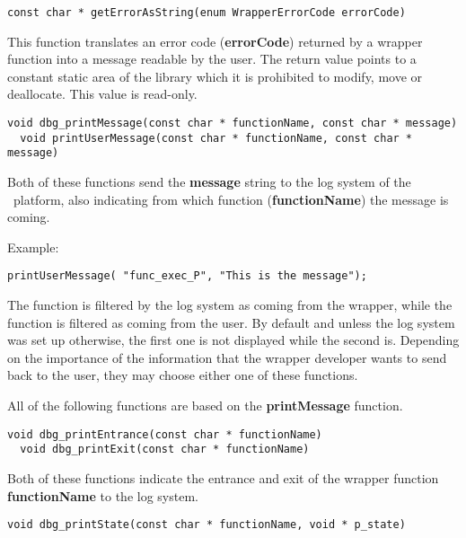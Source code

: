 \lstset{language=C++, basicstyle=\normalsize}
\begin{lstlisting}[frame=TRBL]
  const char * getErrorAsString(enum WrapperErrorCode errorCode)
\end{lstlisting}

This function translates an error code ({\bf errorCode}) returned by a wrapper function into a message readable by the user. The return value points to a constant static area of the library which it is prohibited to modify, move or deallocate. This value is read-only.

\lstset{language=C++, basicstyle=\normalsize}
\begin{lstlisting}[frame=TRBL]
  void dbg_printMessage(const char * functionName, const char * message)
  void printUserMessage(const char * functionName, const char * message)
\end{lstlisting}

Both of these functions send the {\bf message} string to the log system of the \OT\ platform, also indicating from which function ({\bf functionName}) the message is coming.

Example:
\lstset{language=C++, basicstyle=\normalsize}
\begin{lstlisting}[frame=TRBL]
  printUserMessage( "func_exec_P", "This is the message");
\end{lstlisting}

The  function is filtered by the log system as coming from the wrapper, while the  function is filtered as coming from the user. By default and unless the log system was set up otherwise, the first one is not displayed while the second is. Depending on the importance of the information that the wrapper developer wants to send back to the user, they may choose either one of these functions.

All of the following functions are based on the {\bf printMessage} function.

\lstset{language=C++, basicstyle=\normalsize}
\begin{lstlisting}[frame=TRBL]
  void dbg_printEntrance(const char * functionName)
  void dbg_printExit(const char * functionName)
\end{lstlisting}

Both of these functions indicate the entrance and exit of the wrapper function {\bf functionName} to the log system.

\lstset{language=C++, basicstyle=\normalsize}
\begin{lstlisting}[frame=TRBL]
  void dbg_printState(const char * functionName, void * p_state)
\end{lstlisting}

